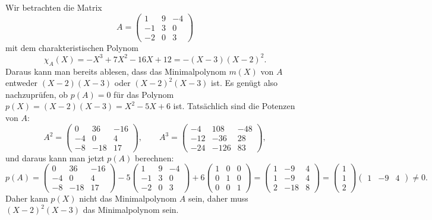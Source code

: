 \begin{beispiel}
Wir betrachten die Matrix
\[
A
=
\begin{pmatrix}
   1&  9& -4\\
  -1&  3&  0\\
  -2&  0&  3
\end{pmatrix}
\]
mit dem charakteristischen Polynom
\[
\chi_A(X)
=
-X^3+7X^2-16 X+12
=
-(X-3)(X-2)^2.
\]
Daraus kann man bereits ablesen, dass das Minimalpolynom $m(X)$ von $A$ 
entweder $(X-2)(X-3)$ oder $(X-2)^2(X-3)$ ist.
Es genügt also nachzuprüfen, ob $p(A)=0$ für das Polynom
$p(X)=(X-2)(X-3) = X^2-5X+6$ ist.
Tatsächlich sind die Potenzen von $A$:
\begin{equation}
A^2=
\begin{pmatrix}
  0&  36& -16 \\
 -4&   0&   4 \\
 -8& -18&  17 
\end{pmatrix}
,\qquad
A^3=
\begin{pmatrix}
 -4& 108& -48\\
-12& -36&  28\\
-24&-126&  83
\end{pmatrix},
\label{buch:eigenwerte:eqn:A2A3}
\end{equation}
und daraus kann man jetzt $p(A)$ berechnen:
\begin{equation}
p(A)
=
\begin{pmatrix}
  0&  36& -16 \\
 -4&   0&   4 \\
 -8& -18&  17 
\end{pmatrix}
-5
\begin{pmatrix}
   1&  9& -4\\
  -1&  3&  0\\
  -2&  0&  3
\end{pmatrix}
+
6
\begin{pmatrix}
1&0&0\\
0&1&0\\
0&0&1
\end{pmatrix}
=
\begin{pmatrix}
   1& -9&  4\\
   1& -9&  4\\
   2&-18&  8
\end{pmatrix}
=
\begin{pmatrix}1\\1\\2\end{pmatrix}
\begin{pmatrix}1&-9&4\end{pmatrix}
\ne 0.
\label{buch:eigenwerte:eqn:nichtminimalpolynom}
\end{equation}
Daher kann $p(X)$ nicht das Minimalpolynom $A$
sein, daher muss $(X-2)^2(X-3)$ das Minimalpolynom sein.


\end{beispiel}

